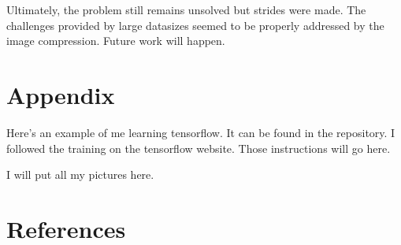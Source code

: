 \documentclass{amsart}
\theoremstyle{definition}
\begin{document}
Ultimately, the problem still remains unsolved but strides were made.
The challenges provided by large datasizes seemed to be properly addressed by the image compression.
Future work will happen.











\section{Appendix}


Here's an example of me learning tensorflow.
It can be found in the repository.
I followed the training on the tensorflow website.
Those instructions will go here.


I will put all my pictures here.








\section{References}

\end{document}
